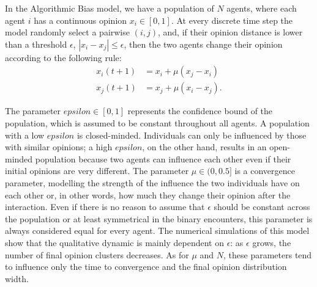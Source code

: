 \documentclass[10pt,letterpaper]{article}
\begin{document}
In the Algorithmic Bias model, we have a population of $N$ agents, where each agent $i$ has a continuous opinion $x_{i} \in [0,1]$. 
At every discrete time step the model randomly select a pairwise $(i, j)$, and, if their opinion distance is lower than a threshold $\epsilon$, $|x_{i} - x_{j}| \leq \epsilon$, then the two agents change their opinion according to the following rule:
\begin{equation}
\begin{aligned} 
    \label{eq:updateDW}
    x_{i}(t+1) &=  x_{i} + \mu(x_{j}-x_{i}) \\ 
    x_{j}(t+1) &=  x_{j} + \mu(x_{i}-x_{j}).
\end{aligned}   
\end{equation}

The parameter $epsilon \in [0,1]$ represents the confidence bound of the population, which is assumed to be constant throughout all agents.
A population with a low $epsilon$ is closed-minded. Individuals can only be influenced by those with similar opinions; a high $epsilon$, on the other hand, results in an open-minded population because two agents can influence each other even if their initial opinions are very different.
The parameter $\mu \in (0, 0.5]$ is a convergence parameter, modelling the strength of the influence the two individuals have on each other or, in other words, how much they change their opinion after the interaction. 
Even if there is no reason to assume that $\epsilon$ should be constant across the population or at least symmetrical in the binary encounters, this parameter is always considered equal for every agent. 
The numerical simulations of this model show that the qualitative dynamic is mainly dependent on $\epsilon$: as $\epsilon$ grows, the number of final opinion clusters decreases. 
As for $\mu$ and $N$, these parameters tend to influence only the time to convergence and the final opinion distribution width. 
\end{document}
